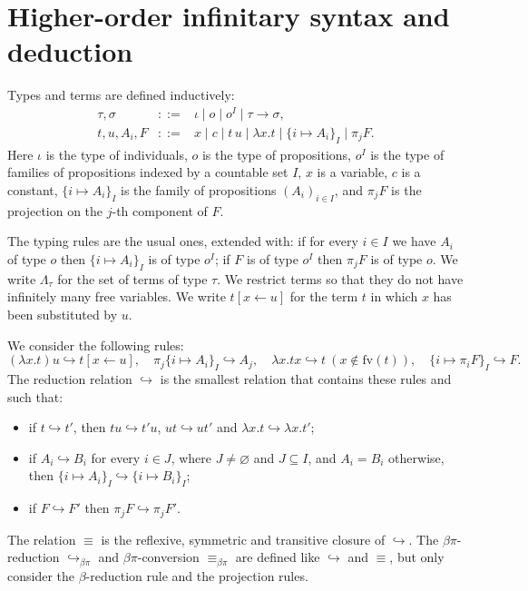 \section*{Higher-order infinitary syntax and deduction}
\begin{authordef}[1]
Types and terms are defined inductively:
\[\begin{array}{rcl}\tau,\sigma&::=&\iota\mid o\mid o^I\mid\tau\to\sigma,\\t,u,A_i,F&::=&x\mid c\mid t\,u\mid\lambda x.t\mid\{i\mapsto A_i\}_I\mid\pi_jF.\end{array}\]
Here $\iota$ is the type of individuals, $o$ is the type of propositions, $o^I$ is the type of families of propositions indexed by a countable set $I$, $x$ is a variable, $c$ is a constant, $\{i\mapsto A_i\}_I$ is the family of propositions $(A_i)_{i\in I}$, and $\pi_jF$ is the projection on the $j$-th component of $F$.
\end{authordef}
The typing rules are the usual ones, extended with: if for every $i\in I$ we have $A_i$ of type $o$ then $\{i\mapsto A_i\}_I$ is of type $o^I$; if $F$ is of type $o^I$ then $\pi_jF$ is of type $o$. We write $\Lambda_\tau$ for the set of terms of type $\tau$. We restrict terms so that they do not have infinitely many free variables. We write $t[x\leftarrow u]$ for the term $t$ in which $x$ has been substituted by $u$.
\begin{authordef}[3]
We consider the following rules:
\[(\lambda x.t)u\hookrightarrow t[x\leftarrow u],\quad\pi_j\{i\mapsto A_i\}_I\hookrightarrow A_j,\quad\lambda x.tx\hookrightarrow t\ (x\notin\mathrm{fv}(t)),\quad\{i\mapsto\pi_iF\}_I\hookrightarrow F.\]
The reduction relation $\hookrightarrow$ is the smallest relation that contains these rules and such that:
\begin{itemize}\item if $t\hookrightarrow t'$, then $tu\hookrightarrow t'u$, $ut\hookrightarrow ut'$ and $\lambda x.t\hookrightarrow\lambda x.t'$;
\item if $A_i\hookrightarrow B_i$ for every $i\in J$, where $J\ne\varnothing$ and $J\subseteq I$, and $A_i=B_i$ otherwise, then $\{i\mapsto A_i\}_I\hookrightarrow\{i\mapsto B_i\}_I$;
\item if $F\hookrightarrow F'$ then $\pi_jF\hookrightarrow\pi_jF'$.
\end{itemize}
The relation $\equiv$ is the reflexive, symmetric and transitive closure of $\hookrightarrow$. The $\beta\pi$-reduction $\hookrightarrow_{\beta\pi}$ and $\beta\pi$-conversion $\equiv_{\beta\pi}$ are defined like $\hookrightarrow$ and $\equiv$, but only consider the $\beta$-reduction rule and the projection rules.
\end{authordef}

